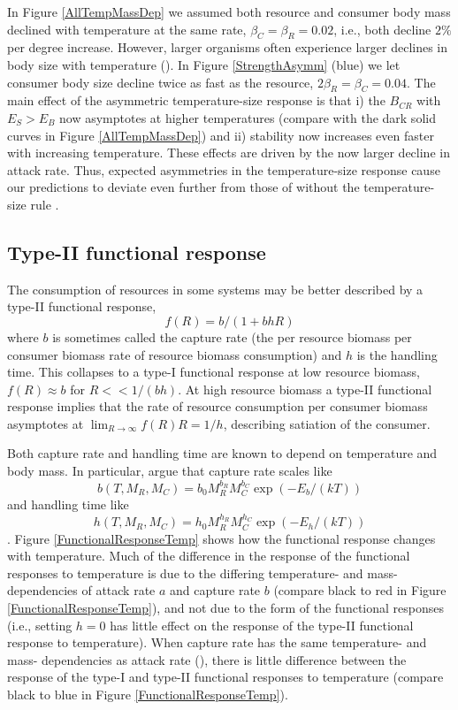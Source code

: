 \documentclass[11pt]{article}
\begin{document}
In Figure \ref{AllTempMassDep} we assumed both resource and consumer body mass declined with temperature at the same rate, $\beta_C = \beta_R = 0.02$, i.e., both decline $2\%$ per degree increase.
However, larger organisms often experience larger declines in body size with temperature (\cite{Forster2012}).
In Figure \ref{StrengthAsymm} (blue) we let consumer body size decline twice as fast as the resource, $2 \beta_R = \beta_C = 0.04$.
The main effect of the asymmetric temperature-size response is that i) the $B_{CR}$ with $E_S > E_B$ now asymptotes at higher temperatures (compare with the dark solid curves in Figure \ref{AllTempMassDep}) and ii) stability now increases even faster with increasing temperature.
These effects are driven by the now larger decline in attack rate.
Thus, expected asymmetries in the temperature-size response cause our predictions to deviate even further from those of without the temperature-size rule \citep{Gilbert2014}.

\subsection*{Type-II functional response}

The consumption of resources in some systems may be better described by a type-II functional response, \[f(R) = b / (1 + b h R)\] where $b$ is sometimes called the capture rate (the per resource biomass per consumer biomass rate of resource biomass consumption) and $h$ is the handling time.
This collapses to a type-I functional response at low resource biomass, $f(R) \approx b$ for $R << 1/(b h)$.
At high resource biomass a type-II functional response implies that the rate of resource consumption per consumer biomass asymptotes at $\lim_{R\rightarrow\infty}f(R) R = 1/h$, describing satiation of the consumer.

Both capture rate and handling time are known to depend on temperature and body mass.
In particular, \cite{Rall2012} argue that capture rate scales like 
\[b(T, M_R, M_C) = b_0 M_R^{b_R} M_C^{b_C} \exp(-E_b/(k T))\]
and handling time like 
\[h(T, M_R, M_C) = h_0 M_R^{h_R} M_C^{h_C} \exp(-E_h/(k T))\].
Figure \ref{FunctionalResponseTemp} shows how the functional response changes with temperature.
Much of the difference in the response of the functional responses to temperature is due to the differing temperature- and mass- dependencies of attack rate $a$ and capture rate $b$ (compare black to red in Figure \ref{FunctionalResponseTemp}), and not due to the form of the functional responses (i.e., setting $h=0$ has little effect on the response of the type-II functional response to temperature).
When capture rate has the same temperature- and mass- dependencies as attack rate (\cite{Gilbert2014}), there is little difference between the response of the type-I and type-II functional responses to temperature (compare black to blue in Figure \ref{FunctionalResponseTemp}).
\end{document}
